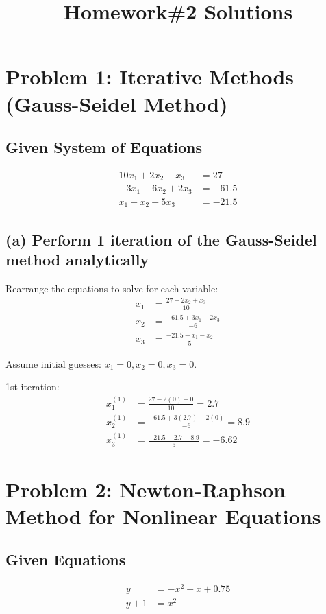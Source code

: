 \documentclass{article}
\title{Homework\#2 Solutions}
\author{}
\date{}
\begin{document}
\maketitle

\section*{Problem 1: Iterative Methods (Gauss-Seidel Method)}

\subsection*{Given System of Equations}
\begin{align*}
10x_1 + 2x_2 - x_3 &= 27 \\
-3x_1 - 6x_2 + 2x_3 &= -61.5 \\
x_1 + x_2 + 5x_3 &= -21.5
\end{align*}

\subsection*{(a) Perform 1 iteration of the Gauss-Seidel method analytically}

Rearrange the equations to solve for each variable:
\begin{align*}
x_1 &= \frac{27 - 2x_2 + x_3}{10} \\
x_2 &= \frac{-61.5 + 3x_1 - 2x_3}{-6} \\
x_3 &= \frac{-21.5 - x_1 - x_2}{5}
\end{align*}

Assume initial guesses: \( x_1 = 0, x_2 = 0, x_3 = 0 \).

1st iteration:
\begin{align*}
x_1^{(1)} &= \frac{27 - 2(0) + 0}{10} = 2.7 \\
x_2^{(1)} &= \frac{-61.5 + 3(2.7) - 2(0)}{-6} = 8.9 \\
x_3^{(1)} &= \frac{-21.5 - 2.7 - 8.9}{5} = -6.62
\end{align*}

\section*{Problem 2: Newton-Raphson Method for Nonlinear Equations}

\subsection*{Given Equations}
\begin{align*}
y &= -x^2 + x + 0.75 \\
y + 1 &= x^2
\end{align*}
\end{document}
